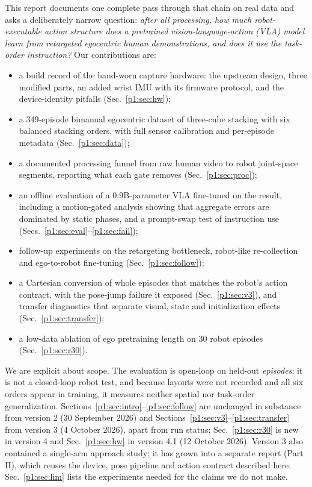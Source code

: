 \documentclass[conference,10pt]{IEEEtran}
\begin{document}
This report documents one complete pass through that chain on real data and asks a deliberately narrow question:
\emph{after all processing, how much robot-executable action structure does a pretrained vision-language-action (VLA) model
learn from retargeted egocentric human demonstrations, and does it use the task-order instruction?} Our contributions are:
\begin{itemize}
\item a build record of the hand-worn capture hardware: the upstream design, three modified parts, an added wrist IMU
with its firmware protocol, and the device-identity pitfalls (Sec.~\ref{p1:sec:hw});
\item a 349-episode bimanual egocentric dataset of three-cube stacking with six balanced stacking orders, with full sensor
calibration and per-episode metadata (Sec.~\ref{p1:sec:data});
\item a documented processing funnel from raw human video to robot joint-space segments, reporting what each gate removes
(Sec.~\ref{p1:sec:proc});
\item an offline evaluation of a 0.9B-parameter VLA fine-tuned on the result, including a motion-gated analysis showing that
aggregate errors are dominated by static phases, and a prompt-swap test of instruction use (Secs.~\ref{p1:sec:eval}--\ref{p1:sec:fail});
\item follow-up experiments on the retargeting bottleneck, robot-like re-collection and ego-to-robot fine-tuning (Sec.~\ref{p1:sec:follow});
\item a Cartesian conversion of whole episodes that matches the robot's action contract, with the pose-jump failure it
exposed (Sec.~\ref{p1:sec:v3}), and transfer diagnostics that separate visual, state and initialization effects (Sec.~\ref{p1:sec:transfer});
\item a low-data ablation of ego pretraining length on 30 robot episodes (Sec.~\ref{p1:sec:r30}).
\end{itemize}
We are explicit about scope. The evaluation is open-loop on held-out \emph{episodes}; it is not a closed-loop robot test,
and because layouts were not recorded and all six orders appear in training, it measures neither spatial nor task-order
generalization. Sections~\ref{p1:sec:intro}--\ref{p1:sec:follow} are unchanged in substance from version 2 (30 September 2026) and
Sections~\ref{p1:sec:v3}--\ref{p1:sec:transfer} from version 3 (4 October 2026), apart from run status; Sec.~\ref{p1:sec:r30} is new in version 4 and Sec.~\ref{p1:sec:hw} in version 4.1 (12 October 2026).
Version 3 also contained a single-arm approach study; it has grown into a separate report (Part II), which reuses the
device, pose pipeline and action contract described here. Sec.~\ref{p1:sec:lim} lists the experiments needed for the claims we
do not make.
\end{document}
